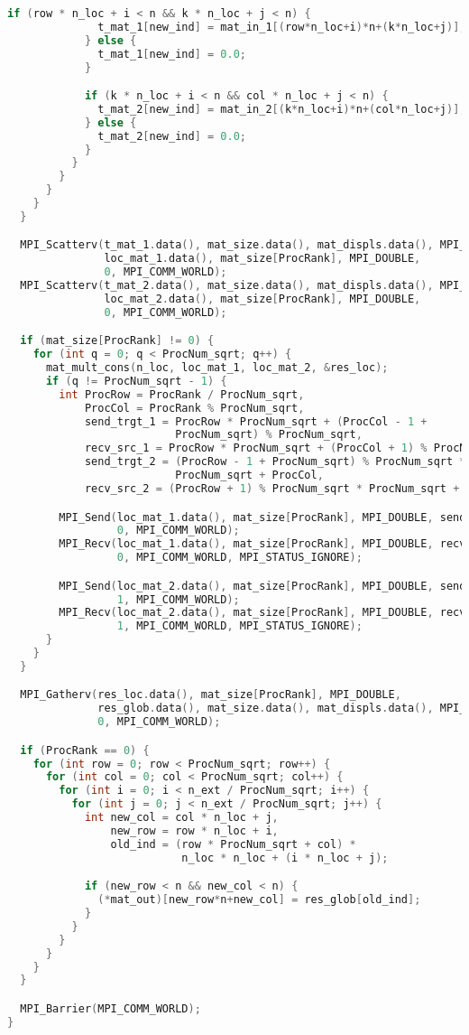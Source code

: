 \documentclass{report}
\begin{document}
\begin{lstlisting}[language=C++]
            if (row * n_loc + i < n && k * n_loc + j < n) {
              t_mat_1[new_ind] = mat_in_1[(row*n_loc+i)*n+(k*n_loc+j)];
            } else {
              t_mat_1[new_ind] = 0.0;
            }

            if (k * n_loc + i < n && col * n_loc + j < n) {
              t_mat_2[new_ind] = mat_in_2[(k*n_loc+i)*n+(col*n_loc+j)];
            } else {
              t_mat_2[new_ind] = 0.0;
            }
          }
        }
      }
    }
  }

  MPI_Scatterv(t_mat_1.data(), mat_size.data(), mat_displs.data(), MPI_DOUBLE,
               loc_mat_1.data(), mat_size[ProcRank], MPI_DOUBLE,
               0, MPI_COMM_WORLD);
  MPI_Scatterv(t_mat_2.data(), mat_size.data(), mat_displs.data(), MPI_DOUBLE,
               loc_mat_2.data(), mat_size[ProcRank], MPI_DOUBLE,
               0, MPI_COMM_WORLD);

  if (mat_size[ProcRank] != 0) {
    for (int q = 0; q < ProcNum_sqrt; q++) {
      mat_mult_cons(n_loc, loc_mat_1, loc_mat_2, &res_loc);
      if (q != ProcNum_sqrt - 1) {
        int ProcRow = ProcRank / ProcNum_sqrt,
            ProcCol = ProcRank % ProcNum_sqrt,
            send_trgt_1 = ProcRow * ProcNum_sqrt + (ProcCol - 1 +
                          ProcNum_sqrt) % ProcNum_sqrt,
            recv_src_1 = ProcRow * ProcNum_sqrt + (ProcCol + 1) % ProcNum_sqrt,
            send_trgt_2 = (ProcRow - 1 + ProcNum_sqrt) % ProcNum_sqrt *
                          ProcNum_sqrt + ProcCol,
            recv_src_2 = (ProcRow + 1) % ProcNum_sqrt * ProcNum_sqrt + ProcCol;

        MPI_Send(loc_mat_1.data(), mat_size[ProcRank], MPI_DOUBLE, send_trgt_1,
                 0, MPI_COMM_WORLD);
        MPI_Recv(loc_mat_1.data(), mat_size[ProcRank], MPI_DOUBLE, recv_src_1,
                 0, MPI_COMM_WORLD, MPI_STATUS_IGNORE);

        MPI_Send(loc_mat_2.data(), mat_size[ProcRank], MPI_DOUBLE, send_trgt_2,
                 1, MPI_COMM_WORLD);
        MPI_Recv(loc_mat_2.data(), mat_size[ProcRank], MPI_DOUBLE, recv_src_2,
                 1, MPI_COMM_WORLD, MPI_STATUS_IGNORE);
      }
    }
  }

  MPI_Gatherv(res_loc.data(), mat_size[ProcRank], MPI_DOUBLE,
              res_glob.data(), mat_size.data(), mat_displs.data(), MPI_DOUBLE,
              0, MPI_COMM_WORLD);

  if (ProcRank == 0) {
    for (int row = 0; row < ProcNum_sqrt; row++) {
      for (int col = 0; col < ProcNum_sqrt; col++) {
        for (int i = 0; i < n_ext / ProcNum_sqrt; i++) {
          for (int j = 0; j < n_ext / ProcNum_sqrt; j++) {
            int new_col = col * n_loc + j,
                new_row = row * n_loc + i,
                old_ind = (row * ProcNum_sqrt + col) *
                           n_loc * n_loc + (i * n_loc + j);

            if (new_row < n && new_col < n) {
              (*mat_out)[new_row*n+new_col] = res_glob[old_ind];
            }
          }
        }
      }
    }
  }

  MPI_Barrier(MPI_COMM_WORLD);
}
\end{lstlisting}
\newpage
\end{document}
